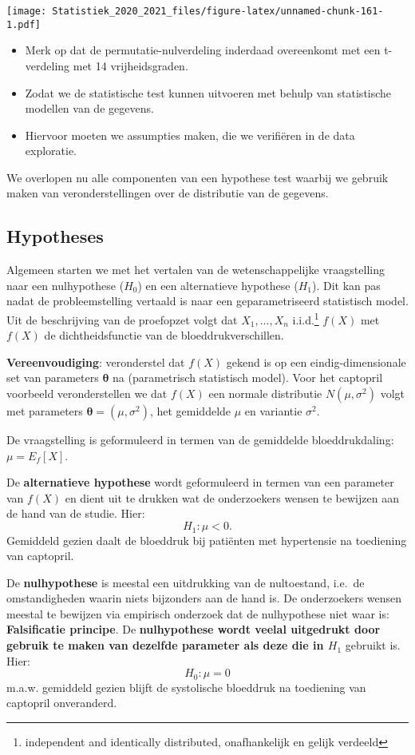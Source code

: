 \documentclass[
  12pt,dutch,coursenotes]{book}
\theoremstyle{definition}
\theoremstyle{definition}
\theoremstyle{definition}
\theoremstyle{remark}
\begin{document}
\texttt{[image: Statistiek\_2020\_2021\_files/figure-latex/unnamed-chunk-161-1.pdf]}

\begin{itemize}
\item
  Merk op dat de permutatie-nulverdeling inderdaad overeenkomt met een t-verdeling met 14 vrijheidsgraden.
\item
  Zodat we de statistische test kunnen uitvoeren met behulp van statistische modellen van de gegevens.
\item
  Hiervoor moeten we assumpties maken, die we verifiëren in de data exploratie.
\end{itemize}

We overlopen nu alle componenten van een hypothese test waarbij we gebruik maken van veronderstellingen over de distributie van de gegevens.

\hypertarget{hypotheses}{%
\subsection{Hypotheses}\label{hypotheses}}

Algemeen starten we met het vertalen van de wetenschappelijke vraagstelling naar een nulhypothese (\(H_0\)) en een alternatieve hypothese (\(H_1\)).
Dit kan pas nadat de probleemstelling vertaald is naar een geparametriseerd statistisch model.
Uit de beschrijving van de proefopzet volgt dat \(X_1,...,X_n\) i.i.d.\footnote{independent and identically distributed, onafhankelijk en gelijk verdeeld} \(f(X)\)
met \(f(X)\) de dichtheidsfunctie van de bloeddrukverschillen.

\textbf{Vereenvoudiging}: veronderstel dat \(f(X)\) gekend is op een eindig-dimensionale set van parameters \(\mathbf{\theta}\) na (parametrisch statistisch model).
Voor het captopril voorbeeld veronderstellen we dat \(f(X)\) een normale distributie \(N(\mu,\sigma^2)\) volgt met parameters \(\mathbf{\theta}=(\mu,\sigma^2)\), het gemiddelde \(\mu\) en variantie \(\sigma^2\).

De vraagstelling is geformuleerd in termen van de gemiddelde bloeddrukdaling: \(\mu=E_f[X]\).

De \textbf{alternatieve hypothese} wordt geformuleerd in termen van een parameter van \(f(X)\) en dient uit te drukken wat de onderzoekers wensen te bewijzen aan de hand van de studie.
Hier:
\[H_1: \mu<0.\]
Gemiddeld gezien daalt de bloeddruk bij patiënten met hypertensie na toediening van captopril.

De \textbf{nulhypothese} is meestal een uitdrukking van de nultoestand, i.e.~de omstandigheden waarin niets bijzonders aan de hand is.
De onderzoekers wensen meestal te bewijzen via empirisch onderzoek dat de nulhypothese niet waar is:
\textbf{Falsificatie principe}.
De \textbf{nulhypothese wordt veelal uitgedrukt door gebruik te maken van dezelfde parameter als deze die in \(H_1\)} gebruikt is. Hier:
\[H_0 : \mu=0\]
m.a.w. gemiddeld gezien blijft de systolische bloeddruk na toediening van captopril onveranderd.
\end{document}
